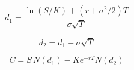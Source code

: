 
\begin{equation}\label{eq:bs_d1}
d_1 = \frac{\ln(S/K) + (r + \sigma^2 / 2) T}{\sigma \sqrt{T}}
\end{equation}

\begin{equation}\label{eq:bs_d2}
d_2 = d_1 - \sigma \sqrt{T}
\end{equation}

\begin{equation}\label{eq:bs_call}
C = S \, N(d_1) - K e^{-rT} N(d_2)
\end{equation}
